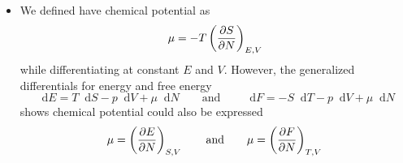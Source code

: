 \documentclass[11pt, a4paper]{article}
\newcommand{\eqtext}[1]{\qquad \text{#1} \qquad}
\newcommand{\diff}{\mathop{}\!\mathrm{d}} %
\newcommand{\pdveval}[3]{\left(\pdv{#1}{#2}\right)_{#3}}
\begin{document}
\begin{itemize}
	\item We defined have chemical potential as 
	\begin{equation*}
		\mu = -T \pdveval{S}{N}{E, V}
	\end{equation*}
	while differentiating at constant $ E $ and $ V $. However, the generalized differentials for energy and free energy
	\begin{equation*}
		\diff E = T \diff S - p\diff V + \mu \diff N \eqtext{and} \diff F = - S \diff T - p\diff V + \mu \diff N
	\end{equation*}
	shows chemical potential could also be expressed 
	\begin{equation*}
		\mu = \pdveval{E}{N}{S, V} \eqtext{and} \mu = \pdveval{F}{N}{T, V}
	\end{equation*}

	
\end{itemize}
\end{document}

